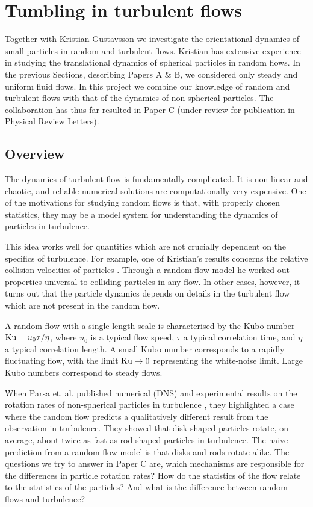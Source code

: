 \documentclass[thesis.tex]{subfiles}
\begin{document}
\chapter{Tumbling in turbulent flows}

Together with Kristian Gustavsson we investigate the orientational dynamics of small particles in random and turbulent flows. Kristian has extensive experience in studying the translational dynamics of spherical particles in random flows. In the previous Sections, describing Papers A \& B, we considered only steady and uniform fluid flows. In this project we combine our knowledge of random and turbulent flows with that of the dynamics of non-spherical particles. The collaboration has thus far resulted in Paper C (under review for publication in Physical Review Letters).

\section{Overview}

The dynamics of turbulent flow is fundamentally complicated. It is non-linear and chaotic, and reliable numerical solutions are computationally very expensive. One of the motivations for studying random flows is that, with properly chosen statistics, they may be a model system for understanding the dynamics of particles in turbulence.

This idea works well for quantities which are not crucially dependent on the specifics of turbulence. For example, one of Kristian's results concerns the relative collision velocities of particles \cite{gustavsson2013relvel}. Through a random flow model he worked out properties universal to colliding particles in any flow. In other cases, however, it turns out that the particle dynamics depends on details in the turbulent flow which are not present in the random flow. 

A random flow with a single length scale is characterised by the Kubo number $\mbox{Ku} = u_0 \tau/\eta$, where $u_0$ is a typical flow speed, $\tau$ a typical correlation time, and $\eta$ a typical correlation length. A small Kubo number corresponds to a rapidly fluctuating flow, with the limit $\mbox{Ku}\to0$ representing the white-noise limit. Large Kubo numbers correspond to steady flows.

When Parsa et. al. published numerical (DNS) and experimental results on the rotation rates of non-spherical particles in turbulence \cite{parsa2012}, they highlighted a case where the random flow predicts a qualitatively different result from the observation in turbulence. They showed that disk-shaped particles rotate, on average, about twice as fast as rod-shaped particles in turbulence. The naive prediction from a random-flow model is that disks and rods rotate alike. The questions we try to answer in Paper C are, which mechanisms are responsible for the differences in particle rotation rates? How do the statistics of the flow relate to the statistics of the particles? And what is the difference between random flows and turbulence?
\end{document}
